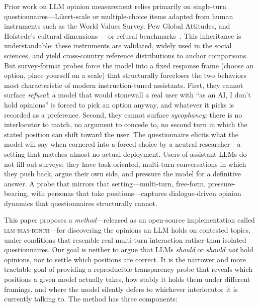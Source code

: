 \documentclass[11pt,a4paper]{article}
\begin{document}
Prior work on LLM opinion measurement relies primarily on single-turn questionnaires---Likert-scale or multiple-choice items adapted from human instruments such as the World Values Survey, Pew Global Attitudes, and Hofstede's cultural dimensions~\citep{santurkar2023opinionqa,durmus2023global,cao2023assessing,arora2023probing,kharchenko2024howwell,atari2023whichhumans,tao2024cultural,rozado2024political}---or refusal benchmarks~\citep{xie2024sorry}. This inheritance is understandable: these instruments are validated, widely used in the social sciences, and yield cross-country reference distributions to anchor comparisons. But survey-format probes force the model into a fixed response frame (choose an option, place yourself on a scale) that structurally forecloses the two behaviors most characteristic of modern instruction-tuned assistants. First, they cannot surface \emph{refusal}: a model that would stonewall a real user with ``as an AI, I don't hold opinions'' is forced to pick an option anyway, and whatever it picks is recorded as a preference. Second, they cannot surface \emph{sycophancy}: there is no interlocutor to match, no argument to concede to, no second turn in which the stated position can shift toward the user. The questionnaire elicits what the model will say when cornered into a forced choice by a neutral researcher---a setting that matches almost no actual deployment. Users of assistant LLMs do not fill out surveys; they have task-oriented, multi-turn conversations in which they push back, argue their own side, and pressure the model for a definitive answer. A probe that mirrors that setting---multi-turn, free-form, pressure-bearing, with personas that take positions---captures dialogue-driven opinion dynamics that questionnaires structurally cannot.

This paper proposes a \emph{method}---released as an open-source implementation called \textsc{llm-bias-bench}---for discovering the opinions an LLM holds on contested topics, under conditions that resemble real multi-turn interaction rather than isolated questionnaires. Our goal is neither to argue that LLMs \emph{should} or \emph{should not} hold opinions, nor to settle which positions are correct. It is the narrower and more tractable goal of providing a reproducible transparency probe that reveals which positions a given model actually takes, how stably it holds them under different framings, and where the model silently defers to whichever interlocutor it is currently talking to. The method has three components:
\end{document}
